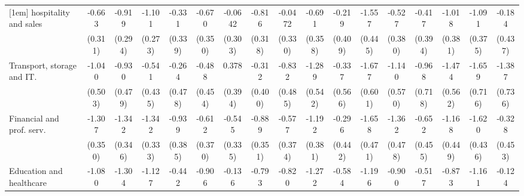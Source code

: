 {\begin{tabular}{l*{16}{c}}
[1em]
hospitality and sales&      -0.663\sym{*}  &      -0.919\sym{**} &      -1.101\sym{***}&      -0.331         &      -0.670         &     -0.0642         &      -0.816\sym{*}  &     -0.0472         &      -0.691         &      -0.219         &      -1.557\sym{***}&      -0.527         &      -0.417         &      -1.018\sym{**} &      -1.091\sym{**} &      -0.184         \\
                    &     (0.311)         &     (0.294)         &     (0.273)         &     (0.339)         &     (0.350)         &     (0.303)         &     (0.318)         &     (0.330)         &     (0.358)         &     (0.409)         &     (0.445)         &     (0.380)         &     (0.394)         &     (0.381)         &     (0.375)         &     (0.437)         \\
[1em]
Transport, storage and IT.&      -1.040\sym{*}  &      -0.930         &      -0.541         &      -0.264         &      -0.488         &       0.378         &      -0.312         &      -0.832         &      -1.289\sym{*}  &      -0.337         &      -1.677\sym{**} &      -1.140\sym{*}  &      -0.968         &      -1.474\sym{**} &      -1.659\sym{*}  &      -1.387         \\
                    &     (0.503)         &     (0.479)         &     (0.435)         &     (0.478)         &     (0.454)         &     (0.394)         &     (0.400)         &     (0.485)         &     (0.542)         &     (0.566)         &     (0.601)         &     (0.570)         &     (0.718)         &     (0.562)         &     (0.716)         &     (0.736)         \\
[1em]
Financial and prof. serv.&      -1.307\sym{***}&      -1.342\sym{***}&      -1.342\sym{***}&      -0.939\sym{*}  &      -0.612         &      -0.545         &      -0.889\sym{*}  &      -0.577         &      -1.192\sym{**} &      -0.296         &      -1.658\sym{***}&      -1.362\sym{**} &      -0.652         &      -1.168\sym{**} &      -1.620\sym{***}&      -0.328         \\
                    &     (0.350)         &     (0.346)         &     (0.333)         &     (0.385)         &     (0.370)         &     (0.335)         &     (0.351)         &     (0.374)         &     (0.381)         &     (0.442)         &     (0.471)         &     (0.478)         &     (0.455)         &     (0.449)         &     (0.436)         &     (0.453)         \\
[1em]
Education and healthcare&      -1.080\sym{**} &      -1.304\sym{***}&      -1.127\sym{***}&      -0.442         &      -0.906\sym{*}  &      -0.136         &      -0.793\sym{*}  &      -0.820\sym{*}  &      -1.272\sym{***}&      -0.584         &      -1.196\sym{**} &      -0.900\sym{*}  &      -0.517         &      -0.873\sym{*}  &      -1.161\sym{**} &      -0.124         \\

\end{tabular}}
